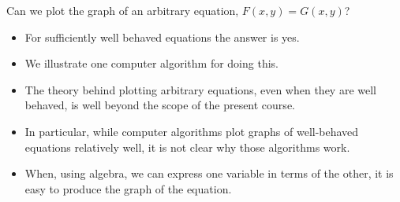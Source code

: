 \begin{frame}
\begin{question}
Can we plot the graph of an arbitrary equation, $F(x,y)=G(x,y)$?
\end{question}
\begin{itemize}
\item<2-> For sufficiently well behaved equations the answer is yes.
\item<3-> We illustrate one computer algorithm for doing this.
\item<4-> The theory behind plotting arbitrary equations, even when they are well behaved, is well beyond the scope of the present course. 
\item<5-> In particular, while computer algorithms plot graphs of well-behaved equations relatively well, it is not clear why those algorithms work.
\item<6-> When, using algebra, we can express one variable in terms of the other, it is easy to produce the graph of the equation.
\end{itemize}
\end{frame}

